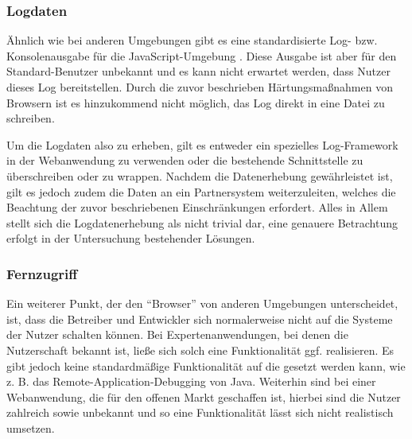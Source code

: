 \subsubsection{Logdaten}
\label{sec:logdaten}

Ähnlich wie bei anderen Umgebungen gibt es eine standardisierte Log- bzw. Konsolenausgabe für die JavaScript-Umgebung \cite{MDNConsole}. Diese Ausgabe ist aber für den Standard-Benutzer unbekannt und es kann nicht erwartet werden, dass Nutzer dieses Log bereitstellen. Durch die zuvor beschrieben Härtungsmaßnahmen von Browsern ist es hinzukommend nicht möglich, das Log direkt in eine Datei zu schreiben.

Um die Logdaten also zu erheben, gilt es entweder ein spezielles Log-Framework in der Webanwendung zu verwenden oder die bestehende Schnittstelle zu überschreiben oder zu wrappen. Nachdem die Datenerhebung gewährleistet ist, gilt es jedoch zudem die Daten an ein Partnersystem weiterzuleiten, welches die Beachtung der zuvor beschriebenen Einschränkungen erfordert. Alles in Allem stellt sich die Logdatenerhebung als nicht trivial dar, eine genauere Betrachtung erfolgt in der Untersuchung bestehender Lösungen.

\subsubsection{Fernzugriff}

Ein weiterer Punkt, der den \enquote{Browser} von anderen Umgebungen unterscheidet, ist, dass die Betreiber und Entwickler sich normalerweise nicht auf die Systeme der Nutzer schalten können. Bei Expertenanwendungen, bei denen die Nutzerschaft bekannt ist, ließe sich solch eine Funktionalität ggf. realisieren. Es gibt jedoch keine standardmäßige Funktionalität auf die gesetzt werden kann, wie z. B. das Remote-Application-Debugging \cite{JavaDebugWireProtocol} von Java. Weiterhin sind bei einer Webanwendung, die für den offenen Markt geschaffen ist, hierbei sind die Nutzer zahlreich sowie unbekannt und so eine Funktionalität lässt sich nicht realistisch umsetzen.